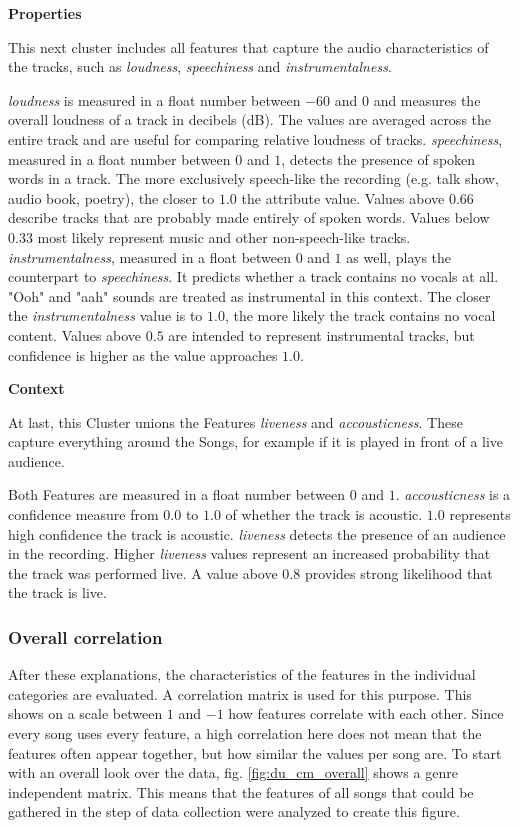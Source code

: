 \textbf{Properties}

This next cluster includes all features that capture the audio characteristics of the tracks,
such as \emph{loudness}, \emph{speechiness} and \emph{instrumentalness}.

\emph{loudness} is measured in a float number between \(-60\) and \(0\) and measures the overall loudness
of a track in decibels (dB). 
The values are averaged across the entire track and are useful for comparing relative
loudness of tracks. 
\emph{speechiness}, measured in a float number between \(0\) and \(1\), detects the presence of spoken words in a track. 
The more exclusively speech-like the recording (e.g. talk show, audio book, poetry),
the closer to \(1.0\) the attribute value. 
Values above \(0.66\) describe tracks that are probably made entirely of spoken words. Values below \(0.33\) most likely represent music and other non-speech-like tracks. 
\emph{instrumentalness}, measured in a float between \(0\) and \(1\) as well, plays the counterpart to \emph{speechiness}.
It predicts whether a track contains no vocals at all. "Ooh" and "aah" sounds are treated as instrumental in this context.
The closer the \emph{instrumentalness} value is to \(1.0\), the more likely the track contains no vocal content. 
Values above \(0.5\) are intended to represent instrumental tracks, but confidence is higher as the value approaches \(1.0\).

\textbf{Context}

At last, this Cluster unions the Features \emph{liveness} and \emph{accousticness}.
These capture everything around the Songs, for example if it is played in front of a live audience.

Both Features are measured in a float number between \(0\) and \(1\).
\emph{accousticness} is a confidence measure from \(0.0\) to \(1.0\) of whether the track is acoustic. \(1.0\) represents high confidence the track is acoustic. 
\emph{liveness} detects the presence of an audience in the recording. 
Higher \emph{liveness} values represent an increased probability that the track was performed live.
A value above \(0.8\) provides strong likelihood that the track is live. 

\subsubsection{Overall correlation}
After these explanations, the characteristics of the features in the individual categories are evaluated.
A correlation matrix is used for this purpose. This shows on a scale between \(1\) and \(-1\) how
features correlate with each other. Since every song uses every feature,
a high correlation here does not mean that the features often appear together,
but how similar the values per song are. To start with an overall look over the data,
fig. \ref{fig:du_cm_overall}  shows a genre independent matrix.
This means that the features of all songs that could be gathered in the step of data
collection were analyzed to create this figure. 

